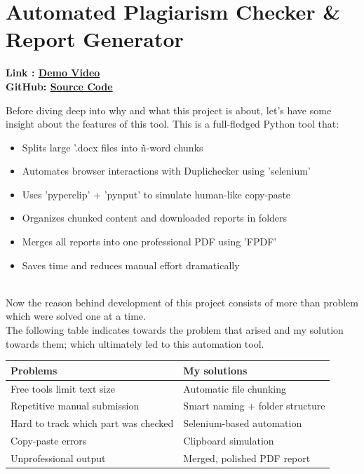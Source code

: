\documentclass{report}
\begin{document}
\section{Automated Plagiarism Checker & Report Generator}
{\bf Link : \href{youtuve.com}{\color{blue}Demo Video}}\\
{\bf GitHub: \href{https://github.com/tusharrbhardwaj/Automated-Plagiarism-Checker}{\color{blue}Source Code}} \\ \par
Before diving deep into why and what this project is about, let's have some insight about the features of this tool. This is a full-fledged Python tool that:\\
\begin{itemize}
    \item Splits large '.docx files into \~n-word chunks 
    \item Automates browser interactions with Duplichecker using 'selenium'
    \item Uses 'pyperclip' + 'pynput' to simulate human-like copy-paste 
    \item Organizes chunked content and downloaded reports in folders 
    \item Merges all reports into one professional PDF using 'FPDF' 
    \item Saves time and reduces manual effort dramatically
\end{itemize}\\

Now the reason behind development of this project consists of more than problem which were solved one at a time.\\
The following table indicates towards the problem that arised and my solution towards them; which ultimately led to this automation tool.\\

\begin{tabular}{|m{6.5cm}|m{6.5cm}|}
    \hline
    {\bf Problems} & {\bf My solutions} \\ \hline
    Free tools limit text size  & Automatic file chunking \\ \hline
    Repetitive manual submission  & Smart naming + folder structure \\ \hline
    Hard to track which part was checked & Selenium-based automation \\ \hline
    Copy-paste errors & Clipboard simulation \\ \hline
    Unprofessional output & Merged, polished PDF report\\ \hline

\end{tabular}\\
\end{document}

